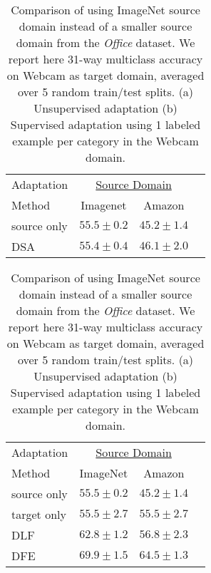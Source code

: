 \begin{table}
\begin{subtable}{0.4\linewidth}
\centering
\begin{tabular}{lccc}
\toprule
Adaptation & \multicolumn{2}{c}{\underline{Source Domain}} \\
Method  & Imagenet & Amazon \\
\midrule
source only & $55.5 \pm 0.2$ & $45.2 \pm 1.4$ \\
\midrule
DSA  & $55.4 \pm 0.4$ & $46.1 \pm 2.0$ \\
\bottomrule
\end{tabular}
\caption{Unsupervised Adaptation}
\label{table:imgnet_unsuper}
\end{subtable}
\hfill
\begin{subtable}{.5\linewidth}
\centering
\hspace{1cm}
\begin{tabular}{lcc c}
\toprule
Adaptation & \multicolumn{2}{c}{\underline{Source Domain}} \\
Method & ImageNet & Amazon \\
\midrule
source only  & $55.5 \pm 0.2$ & $45.2 \pm 1.4$ \\
target only  & $55.5 \pm 2.7$ & $55.5 \pm 2.7$ \\
\midrule
DLF & $62.8 \pm 1.2$ & $56.8 \pm 2.3$ \\
DFE & {$\bm{69.9 \pm 1.5}$} & $64.5 \pm 1.3$ \\
\bottomrule
\end{tabular}
\caption{Supervised Adaptation}
\label{table:imgnet_super}
\end{subtable}
\caption{Comparison of using ImageNet source domain instead of a smaller source domain from the \emph{Office} dataset. We report here 31-way multiclass accuracy on Webcam as target domain, averaged over 5 random train/test splits. (a) Unsupervised adaptation (b) Supervised adaptation using 1 labeled example per category in the Webcam domain.}
\label{tab:imagenet_fc8}
\end{table}
